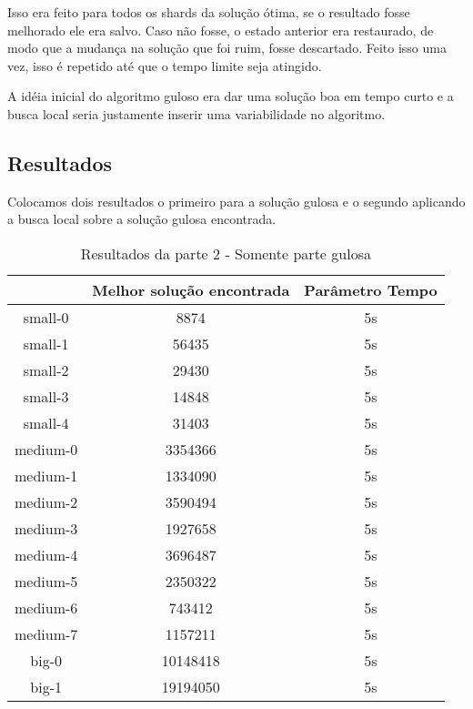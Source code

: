 \documentclass[11pt,letterpaper]{article}
\begin{document}
Isso era feito para todos os shards da solução ótima, se o resultado
fosse melhorado ele era salvo. Caso não fosse, o estado anterior era
restaurado, de modo que a mudança na solução que foi ruim, fosse
descartado. Feito isso uma vez, isso é repetido até
que o tempo limite seja atingido.

A idéia inicial do algoritmo guloso era dar uma solução boa em tempo
curto e a busca local seria justamente inserir uma variabilidade no algoritmo.

\subsection{Resultados}

Colocamos dois resultados o primeiro para a solução gulosa e o segundo
aplicando a busca local sobre a solução gulosa encontrada.

\addtocounter{footnote}{1}

\begin{table}[h!]
\begin{centering}
\begin{tabular}{|c|c|c|}
\hline 
 & Melhor solução encontrada & Parâmetro Tempo  \tabularnewline
\hline 
\hline 
small-0 & 8874 & 5s \tabularnewline %
\hline 
small-1 & 56435 & 5s  \tabularnewline %
\hline 
small-2 & 29430 & 5s \tabularnewline %
\hline 
small-3 & 14848 & 5s \tabularnewline %
\hline 
small-4 & 31403 & 5s \tabularnewline %
\hline 
medium-0 & 3354366 & 5s \tabularnewline %
\hline 
medium-1 & 1334090 & 5s \tabularnewline %
\hline 
medium-2 & 3590494 & 5s \tabularnewline %
\hline 
medium-3 & 1927658 & 5s \tabularnewline %
\hline 
medium-4 & 3696487 & 5s \tabularnewline %
\hline 
medium-5 & 2350322 & 5s \tabularnewline %
\hline 
medium-6 & 743412 & 5s \tabularnewline %
\hline 
medium-7 & 1157211 & 5s \tabularnewline %
\hline 
big-0 & 10148418 & 5s \tabularnewline %
\hline 
big-1 & 19194050 & 5s \tabularnewline %
\hline 

\end{tabular}
\par\end{centering}
\caption{Resultados da parte 2 - Somente parte gulosa}
\end{table}
\end{document}
